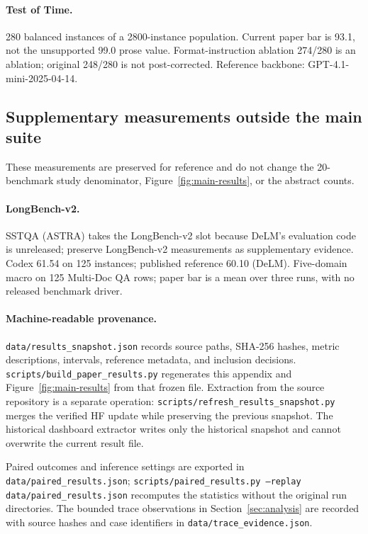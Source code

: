 \paragraph{Test of Time.} 280 balanced instances of a 2800-instance population. Current paper bar is 93.1, not the unsupported 99.0 prose value. Format-instruction ablation 274/280 is an ablation; original 248/280 is not post-corrected. Reference backbone: GPT-4.1-mini-2025-04-14.

\subsection{Supplementary measurements outside the main suite}
\label{app:supplementary-results}
These measurements are preserved for reference and do not change the 20-benchmark
study denominator, Figure~\ref{fig:main-results}, or the abstract counts.
\paragraph{LongBench-v2.} SSTQA (ASTRA) takes the LongBench-v2 slot because DeLM's evaluation code is unreleased; preserve LongBench-v2 measurements as supplementary evidence. Codex 61.54 on 125 instances; published reference 60.10 (DeLM). Five-domain macro on 125 Multi-Doc QA rows; paper bar is a mean over three runs, with no released benchmark driver.

\paragraph{Machine-readable provenance.}
\texttt{data/results\_snapshot.json} records source paths, SHA-256 hashes, metric
descriptions, intervals, reference metadata, and inclusion decisions.
\texttt{scripts/build\_paper\_results.py} regenerates this appendix and Figure~\ref{fig:main-results}
from that frozen file. Extraction from the source repository is a separate operation:
\texttt{scripts/refresh\_results\_snapshot.py} merges the verified HF update while
preserving the previous snapshot. The historical dashboard extractor writes only the
historical snapshot and cannot overwrite the current result file.

Paired outcomes and inference settings are exported in \texttt{data/paired\_results.json};
\texttt{scripts/paired\_results.py --replay data/paired\_results.json} recomputes the
statistics without the original run directories. The bounded trace observations in
Section~\ref{sec:analysis} are recorded with source hashes and case identifiers in
\texttt{data/trace\_evidence.json}.
